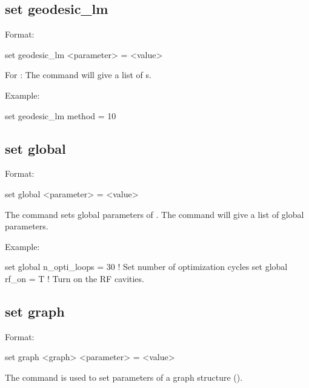 {{%

\subsection{set geodesic_lm}
\label{s:set.geodesic.lm}

Format:
\begin{example}
  set geodesic_lm <parameter> = <value>
\end{example}

For : The  command will give a list of
s.

Example:
\begin{example}
  set geodesic_lm method = 10
\end{example}


\subsection{set global}
\label{s:set.global}

Format:
\begin{example}
  set global <parameter> = <value>
\end{example}

The  command sets global parameters of \tao. The  command will give
a list of global parameters.

Example:
\begin{example}
  set global n_opti_loops = 30  ! Set number of optimization cycles
  set global rf_on = T          ! Turn on the RF cavities.
\end{example}


\subsection{set graph}
\label{s:set.graph}

Format:
\begin{example}
  set graph <graph> <parameter> = <value>
\end{example}

The  command is used to set parameters of a graph structure ().

}}
